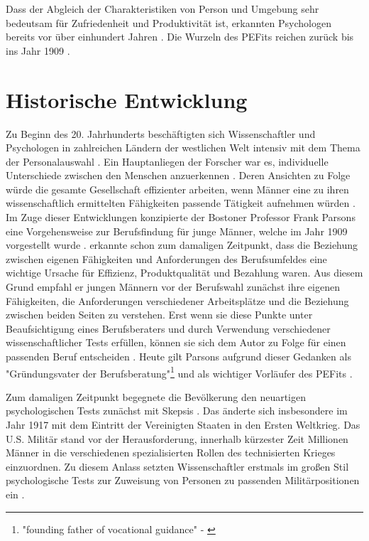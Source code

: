 Dass der Abgleich der Charakteristiken von Person und Umgebung sehr bedeutsam für Zufriedenheit und Produktivität ist, erkannten Psychologen bereits vor über einhundert Jahren \cite[S. 3ff.]{parsons:1909}. Die Wurzeln des \acp{PEFit} reichen zurück bis ins Jahr 1909 \cite[S. 1]{su:2015}.

\section{Historische Entwicklung}
\label{ch:personEnvironmentFit:historisches}
Zu Beginn des 20. Jahrhunderts beschäftigten sich Wissenschaftler und Psychologen in zahlreichen Ländern der westlichen Welt intensiv mit dem Thema der Personalauswahl \cite[S. 1f.]{salgado:2001}. Ein Hauptanliegen der Forscher war es, individuelle Unterschiede zwischen den Menschen anzuerkennen \cite[S. 1ff.]{stern:1900}. Deren Ansichten zu Folge würde die gesamte Gesellschaft effizienter arbeiten, wenn Männer eine zu ihren wissenschaftlich ermittelten Fähigkeiten passende Tätigkeit aufnehmen würden \cite[S. 1f.]{kevles:1968}. Im Zuge dieser Entwicklungen konzipierte der Bostoner Professor Frank Parsons eine Vorgehensweise zur Berufsfindung für junge Männer, welche im Jahr 1909 vorgestellt wurde \cite[S. 1]{su:2015}. \textcite[S. 5ff.]{parsons:1909} erkannte schon zum damaligen Zeitpunkt, dass die Beziehung zwischen eigenen Fähigkeiten und Anforderungen des Berufsumfeldes eine wichtige Ursache für Effizienz, Produktqualität und Bezahlung waren. Aus diesem Grund empfahl er jungen Männern vor der Berufswahl zunächst ihre eigenen Fähigkeiten, die Anforderungen verschiedener Arbeitsplätze und die Beziehung zwischen beiden Seiten zu verstehen. Erst wenn sie diese Punkte unter Beaufsichtigung eines Berufsberaters und durch Verwendung verschiedener wissenschaftlicher Tests erfüllen, können sie sich dem Autor zu Folge für einen passenden Beruf entscheiden \cite[S. 5ff.]{parsons:1909}. Heute gilt Parsons aufgrund dieser Gedanken als "Gründungsvater der Berufsberatung"\footnote{"founding father of vocational guidance" - \textcite[S. 3, Z. 29]{porfeli:2009}} \cite[S. 3, Z. 29]{porfeli:2009} und als wichtiger Vorläufer des \acp{PEFit} \cite[S. 2]{edwards:2008}\cite[S. 1]{su:2015}.

Zum damaligen Zeitpunkt begegnete die Bevölkerung den neuartigen psychologischen Tests zunächst mit Skepsis \cite[S. 2]{kevles:1968}. Das änderte sich insbesondere im Jahr 1917 mit dem Eintritt der Vereinigten Staaten in den Ersten Weltkrieg. Das U.S. Militär stand vor der Herausforderung, innerhalb kürzester Zeit Millionen Männer in die verschiedenen spezialisierten Rollen des technisierten Krieges einzuordnen. Zu diesem Anlass setzten Wissenschaftler erstmals im großen Stil psychologische Tests zur Zuweisung von Personen zu passenden Militärpositionen ein \cite[S. 2ff.]{kevles:1968}. 

